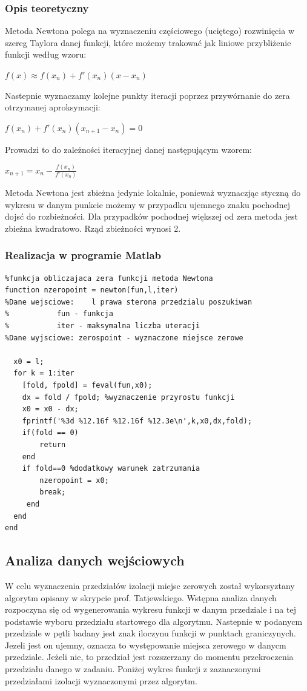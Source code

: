 \documentclass[a4paper, 11pt]{article}
\begin{document}
\subsubsection{Opis teoretyczny}
Metoda Newtona polega na wyznaczeniu częściowego (uciętego) rozwinięcia w szereg Taylora danej funkcji, które możemy trakować jak liniowe przybliżenie funkcji według wzoru:\
  	\begin{center}
  	$f(x) \approx f(x_{n})+f'(x_{n})(x-x_{n})$
	\end{center}
Nastepnie wyznaczamy kolejne punkty iteracji poprzez przywórnanie do zera otrzymanej aproksymacji:\\
\begin{center}
$f(x_{n})+f'(x_{n})(x_{n+1}-x_{n}) = 0$
\end{center}
Prowadzi to do zależności iteracyjnej danej następującym wzorem:\\
\begin{center}
$x_{n+1} = x_{n}-\frac{f(x_{n})}{f'(x_{n})}$
\end{center}
Metoda Newtona jest zbieżna jedynie lokalnie, ponieważ wyznaczjąc styczną do wykresu w danym punkcie możemy w przypadku ujemnego znaku pochodnej dojsć do rozbieżności. Dla przypadków pochodnej większej od zera metoda jest zbieżna kwadratowo. Rząd zbieżności wynosi 2.

\subsubsection{Realizacja w programie Matlab}
\begin{lstlisting}
%funkcja obliczajaca zera funkcji metoda Newtona
function nzeropoint = newton(fun,l,iter)
%Dane wejsciowe:	l prawa sterona przedzialu poszukiwan
%			fun - funkcja 
%			iter - maksymalna liczba uteracji
%Dane wyjsciowe: zerospoint - wyznaczone miejsce zerowe
    
  x0 = l; 
  for k = 1:iter
    [fold, fpold] = feval(fun,x0); 
    dx = fold / fpold; %wyznaczenie przyrostu funkcji
    x0 = x0 - dx;
    fprintf('%3d %12.16f %12.16f %12.3e\n',k,x0,dx,fold);
    if(fold == 0)
        return
    end
	if fold==0 %dodatkowy warunek zatrzumania
        nzeropoint = x0;
        break; 
     end
  end
end
\end{lstlisting}

\subsection{Analiza danych wejściowych}
W celu wyznaczenia przedziałów izolacji miejsc zerowych został wykorsyztany algorytm opisany w skrypcie prof. Tatjewskiego. Wstępna analiza danych rozpoczyna się od wygenerowania wykresu funkcji w danym przedziale i na tej podstawie wyboru przedziału startowego dla algorytmu. Nastepnie w podanycm przedziale w pętli badany jest znak iloczynu funkcji w punktach graniczynych. Jezeli jest on ujemny, oznacza to występowanie miejsca zerowego w danycm przedziale. Jeżeli nie, to przedział jest rozszerzany do momentu przekroczenia przedziału danego w zadaniu. 
Poniżej wykres funkcji z zaznaczonymi przedziałami izolacji wyznaczonymi przez algorytm. 
\end{document}
